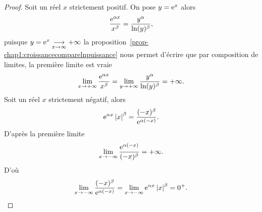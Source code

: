 \begin{proof}
    Soit un réel \(x\) strictement positif. On pose \(y=\operatorname{e}^{x}\) alors
    \begin{equation}
        \frac{\operatorname{e}^{\alpha x}}{x^\beta}=\frac{y^\alpha}{\ln(y)^\beta},
    \end{equation}
    puisque \(y = \operatorname{e}^{x} \underset{x \to \infty}{\longrightarrow}+\infty\) 
    la proposition~\ref{prop-chap1:croissancecomparelnpuissance} nous permet 
    d'écrire que par composition de limites, la première limite est vraie
    \begin{equation}
        \lim\limits_{x \to + \infty} \frac{\operatorname{e}^{\alpha x}}{x^\beta}= 
        \lim\limits_{y \to +\infty} \frac{y^\alpha}{\ln(y)^\beta}=+\infty.
    \end{equation}
    Soit un réel \(x\) strictement négatif, alors
    \begin{equation}
        \operatorname{e}^{\alpha x}\left\lvert x\right\rvert^\beta=\frac{(-x)^\beta}{\operatorname{e}^{\alpha(-x)}}.
    \end{equation}
    D'après la première limite
    \begin{equation}
        \lim\limits_{x \to - \infty} \frac{\operatorname{e}^{\alpha 
        (-x)}}{(-x)^\beta}=+\infty.
    \end{equation}
    D'où
    \begin{equation}
        \lim\limits_{x\to -\infty}\frac{(-x)^\beta}{\operatorname{e}^{\alpha 
        (-x)}}=\lim\limits_{x \to -\infty} \operatorname{e}^{\alpha x} \left\lvert x\right\rvert^\beta=0^+.
    \end{equation}
\end{proof}
